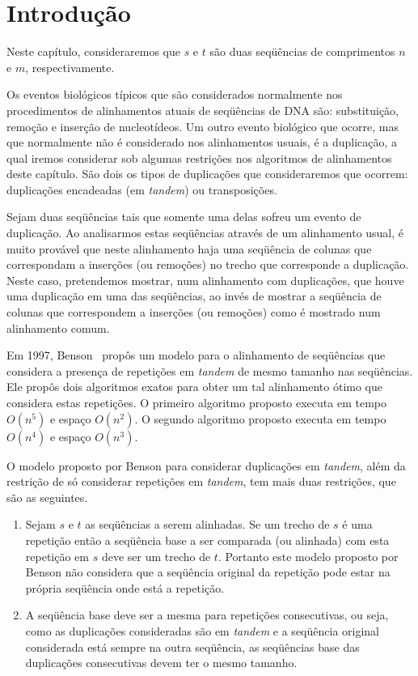 \section{Introdução}
\label{sec:aligndupintro}

Neste capítulo, consideraremos que $s$ e $t$ são duas seqüências de comprimentos 
$n$ e $m$, respectivamente.

Os eventos biológicos típicos que são considerados normalmente nos 
procedimentos de alinhamentos atuais de seqüências de DNA são: substituição, 
remoção e inserção de nucleotídeos. Um outro evento biológico que ocorre, mas 
que normalmente não é considerado nos alinhamentos usuais, é a duplicação, a qual 
iremos considerar sob algumas restrições nos algoritmos de alinhamentos deste 
capítulo. São dois os tipos de duplicações que consideraremos que ocorrem:
duplicações encadeadas (em \emph{tandem}) ou transposições.

Sejam duas seqüências tais que somente uma delas sofreu um evento de duplicação. Ao 
analisarmos estas seqüências através de um alinhamento usual, é muito provável que 
neste alinhamento haja uma seqüência de colunas que correspondam a inserções (ou 
remoções) no trecho que corresponde a duplicação. Neste caso, pretendemos mostrar, 
num alinhamento com duplicações, que houve uma duplicação em uma das seqüências, ao invés de 
mostrar a seqüência de colunas que correspondem a inserções (ou remoções) como é 
mostrado num alinhamento comum.

Em 1997, Benson~\cite{267526} propôs um modelo para o alinhamento de seqüências que 
considera a presença de repetições em \emph{tandem} de mesmo tamanho nas seqüências. 
Ele propôs dois algoritmos exatos para obter um tal alinhamento ótimo que 
considera estas repetições. O primeiro algoritmo proposto executa em tempo 
$O(n^5)$ e espaço $O(n^2)$. O segundo algoritmo proposto executa em tempo 
$O(n^4)$ e espaço $O(n^3)$.

O modelo proposto por 
Benson para considerar duplicações em \emph{tandem}, além da restrição de só 
considerar repetições em \emph{tandem}, tem mais duas restrições, que são as 
seguintes.
\begin{enumerate}
  \item Sejam $s$ e $t$ as seqüências a serem alinhadas. Se um trecho de $s$ é uma 
  repetição então a seqüência base a ser comparada (ou alinhada) com esta repetição em $s$ 
  deve ser um trecho de $t$. Portanto este modelo proposto por Benson não 
  considera que a seqüência original da repetição pode estar na própria seqüência onde está 
  a repetição.
  
  \item A seqüência base deve ser a mesma para repetições consecutivas, ou seja, 
  como as duplicações consideradas são em \emph{tandem} e a seqüência original 
  considerada está sempre na outra seqüência, as seqüências base das duplicações 
  consecutivas devem ter o mesmo tamanho.
\end{enumerate}

